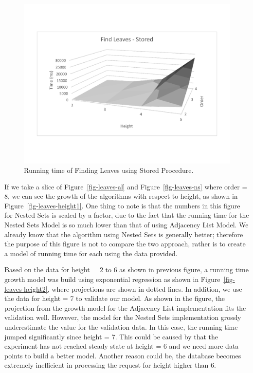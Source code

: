 \begin{figure}[!h]
\begin{center}
\includegraphics[width=6in]{images/eval/leaves/sr_surface.pdf}
\caption{Running time of Finding Leaves using Stored Procedure.\label{fig-leaves-sr}}
\end{center}
\end{figure}

If we take a slice of Figure~\ref{fig-leaves-al} and Figure~\ref{fig-leaves-ns} where order = 8, we can see the growth of the algorithms with respect to height, as shown in Figure~\ref{fig-leaves-height1}. One thing to note is that the numbers in this figure for Nested Sets is scaled by a factor, due to the fact that the running time for the Nested Sets Model is so much lower than that of using Adjacency List Model. We already know that the algorithm using Nested Sets is generally better; therefore the purpose of this figure is not to compare the two approach, rather is to create a model of running time for each using the data provided.


Based on the data for height = 2 to 6 as shown in previous figure, a running time growth model was build using exponential regression as shown in Figure~\ref{fig-leaves-height2}, where projections are shown in dotted lines. In addition, we use the data for height = 7 to validate our model. As shown in the figure, the projection from the growth model for the Adjacency List implementation fits the validation well. However, the model for the Nested Sets implementation grossly underestimate the value for the validation data. In this case, the running time jumped significantly since height = 7. This could be caused by that the experiment has not reached steady state at height = 6 and we need more data points to build a better model. Another reason could be, the database becomes extremely inefficient in processing the request for height higher than 6.


